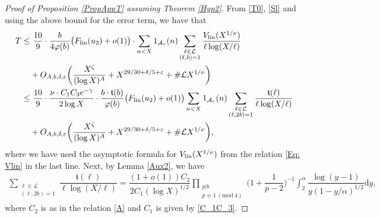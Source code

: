 \documentclass[12pt]{amsart}
\numberwithin{equation}{section}
\theoremstyle{remark}
\theoremstyle{definition}
\newcommand{\imod}[1]{\ (\mathrm{mod}\ #1)}
\begin{document}
\begin{proof}[Proof of Proposition \ref{PropAppT} assuming Theorem \ref{Hyp2}]
From \eqref{T0}, \eqref{Sl} and using the above bound for the error term, we have that
\begin{align}
\notag T \leq &~\dfrac{10}{9}\cdot \dfrac{b}{4\varphi(b)}\big(F_{\textup{lin}}(u_2)+o(1)\big)\cdot \sum_{n<X}1_{\mathcal{A}_r}(n)\sum_{\substack{\ell \in \mathcal{L}\\(\ell, b)=1}}\dfrac{V_{\textup{lin}}(X^{1/\nu})}{\ell \log(X/\ell)}\\
\notag & + O_{A, b, \delta, \varepsilon}\bigg(\dfrac{X^{\zeta}}{(\log X)^A} + X^{29/30+\delta/5+\varepsilon} + \#\mathcal{L}X^{1/\nu}\bigg)\\
 \notag\leq &~\dfrac{10}{9}\cdot \dfrac{\nu\cdot C_1C_3e^{-\gamma}}{2\log X}\cdot \dfrac{b\cdot \mathfrak{t}(b)}{\varphi(b)}\big(F_{\textup{lin}}(u_2)+o(1)\big)\sum_{\substack{n<X}}1_{\mathcal{A}_r}(n)\sum_{\substack{\ell \in \mathcal{L}\\(\ell, 2b)=1}}\dfrac
{\mathfrak{t}(\ell)}{\ell \log (X/\ell)}\\
\label{Tefin} &+  O_{A, b, \delta, \varepsilon}\bigg(\dfrac{X^{\zeta}}{(\log X)^A} + X^{29/30+\delta/5+\varepsilon} + \#\mathcal{L}X^{1/\nu}\bigg),
\end{align}
where we have used the asymptotic formula for $V_{\textup{lin}}(X^{1/\nu})$ from the relation \eqref{Eq: Vlin} in the last line. Next, by Lemma \ref{Aux2}, we have
\begin{align}
\label{tlem}\sum_{\substack{\ell \in \mathcal{L}\\(\ell, 2b)=1}}\dfrac
{\mathfrak{t}(\ell)}{\ell \log (X/\ell)}=\dfrac{(1+o(1))C_2}{2C_1(\log X)^{1/2}}\prod_{\substack{p|b\\p\equiv 1\imod 4}}\bigg(1+\dfrac{1}{p-2}\bigg)^{-1}\int_{2}^\alpha\dfrac{\log (y-1)}{y(1-y/\alpha)^{1/2}}\text{d}y, 
\end{align}
where $C_2$ is as in the relation \eqref{A} and $C_1$ is given by \eqref{C_1C_3}.


\end{proof}
\end{document}
